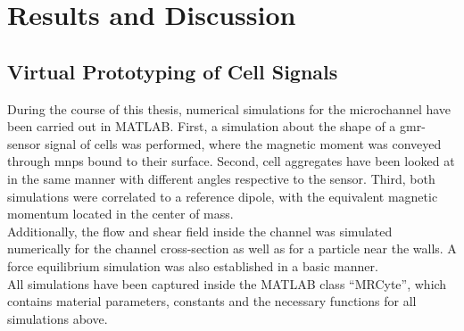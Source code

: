 \chapter{Results and Discussion}
\section{Virtual Prototyping of Cell Signals}
\label{sec:res:simMag}
During the course of this thesis, numerical simulations for the microchannel have been carried out in MATLAB. First, a simulation about the shape of a \gls{gmr}-sensor signal of cells was performed, where the magnetic moment was conveyed through \glspl{mnp} bound to their surface. Second, cell aggregates have been looked at in the same manner with different angles respective to the sensor. Third, both simulations were correlated to a reference dipole, with the equivalent magnetic momentum located in the center of mass.\\
Additionally, the flow and shear field inside the channel was simulated numerically for the channel cross-section as well as for a particle near the walls. A force equilibrium simulation was also established in a basic manner. \\
All simulations have been captured inside the MATLAB class ``MRCyte'', which contains material parameters, constants and the necessary functions for all simulations above.

